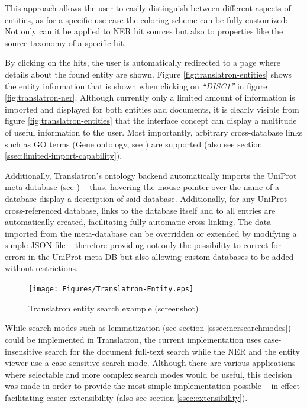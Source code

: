 \documentclass[a4paper, 12pt, twoside, reqn]{report}
\numberwithin{figure}{chapter}
\newtheorem[L]{boxedDefinition}{Definition}
\newtheorem[L]{boxedExample}{Example}
\newcommand{\itquote}[1]{\textit{{``}#1{''}}}
\begin{document}
This approach allows the user to easily distinguish between different aspects of entities, as for a specific use case the coloring scheme can be fully customized: Not only can it be applied to NER hit sources but also to properties like the source taxonomy of a specific hit.

By clicking on the hits, the user is automatically redirected to a page where details about the found entity are shown. Figure \vref{fig:translatron-entities} shows the entity information that is shown when clicking on \itquote{DISC1} in figure \ref{fig:translatron-ner}. Although currently only a limited amount of information is imported and displayed for both entities and documents, it is clearly visible from figure \vref{fig:translatron-entities} that the interface concept can display a multitude of useful information to the user. Most importantly, arbitrary cross-database links such as GO terms (Gene ontology, see \cite{ashburner2000gene}) are supported (also see section \ref{ssec:limited-import-capability}).

Additionally, Translatron's ontology backend automatically imports the UniProt meta-database (see \cite{uniprot-metadb}) -- thus, hovering the mouse pointer over the name of a database display a description of said database. Additionally, for any UniProt cross-referenced database, links to the database itself and to all entries are automatically created, facilitating fully automatic cross-linking. The data imported from the meta-database can be overridden or extended by modifying a simple JSON file -- therefore providing not only the possibility to correct for errors in the UniProt meta-DB but also allowing custom databases to be added without restrictions.

\begin{figure}[!htb]
  \centering
  \texttt{[image: Figures/Translatron-Entity.eps]}
  \caption[Translatron entity search example]{Translatron entity search example (screenshot)}
  \label{fig:translatron-entities}
\end{figure}

While search modes such as lemmatization (see section \ref{sssec:nersearchmodes}) could be implemented in Translatron, the current implementation uses case-insensitive search for the document full-text search while the NER and the entity viewer use a case-sensitive search mode. Although there are various applications where selectable and more complex search modes would be useful, this decision was made in order to provide the most simple implementation possible -- in effect facilitating easier extensibility (also see section \ref{ssec:extensibility}).
\end{document}
